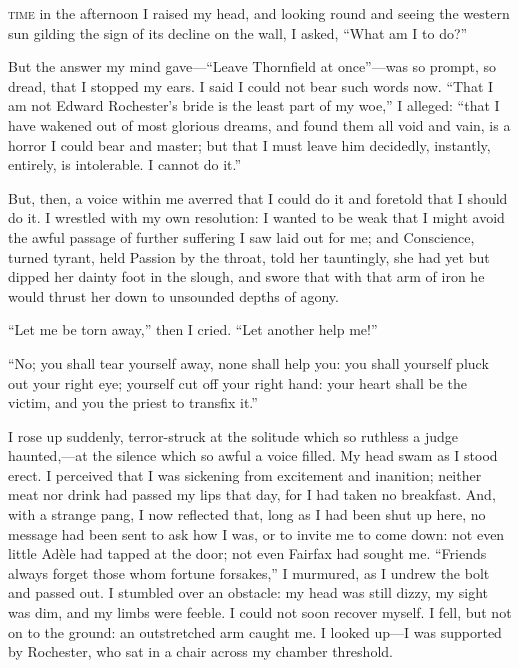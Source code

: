 
 \textsc{time} in the afternoon I raised my head, and looking round and
seeing the western sun gilding the sign of its decline on the wall, I
asked, \enquote{What am I to do?}

\zz
But the answer my mind gave---\enquote{Leave Thornfield at once}---was
so prompt, so dread, that I stopped my ears. I said I could not bear
such words now. \enquote{That I am not Edward Rochester's bride is the
least part of my woe,} I alleged: \enquote{that I have wakened out of
most glorious dreams, and found them all void and vain, is a horror I
could bear and master; but that I must leave him decidedly, instantly,
entirely, is intolerable. I cannot do it.}

But, then, a voice within me averred that I could do it and foretold
that I should do it. I wrestled with my own resolution: I wanted to be
weak that I might avoid the awful passage of further suffering I saw
laid out for me; and Conscience, turned tyrant, held Passion by the
throat, told her tauntingly, she had yet but dipped her dainty foot in
the slough, and swore that with that arm of iron he would thrust her
down to unsounded depths of agony.

\enquote{Let me be torn away,} then I cried. \enquote{Let another help
me!}

\enquote{No; you shall tear yourself away, none shall help you: you
shall yourself pluck out your right eye; yourself cut off your right
hand: your heart shall be the victim, and you the priest to transfix
it.}

I rose up suddenly, terror-struck at the solitude which so ruthless a
judge haunted,---at the silence which so awful a voice filled. My head
swam as I stood erect. I perceived that I was sickening from excitement
and inanition; neither meat nor drink had passed my lips that day, for I
had taken no breakfast. And, with a strange pang, I now reflected that,
long as I had been shut up here, no message had been sent to ask how I
was, or to invite me to come down: not even little Adèle had tapped at
the door; not even \Mrs{} Fairfax had sought me. \enquote{Friends always
forget those whom fortune forsakes,} I murmured, as I undrew the bolt
and passed out. I stumbled over an obstacle: my head was still dizzy,
my sight was dim, and my limbs were feeble. I could not soon recover
myself. I fell, but not on to the ground: an outstretched arm caught
me. I looked up---I was supported by \Mr{} Rochester, who sat in a chair
across my chamber threshold.

